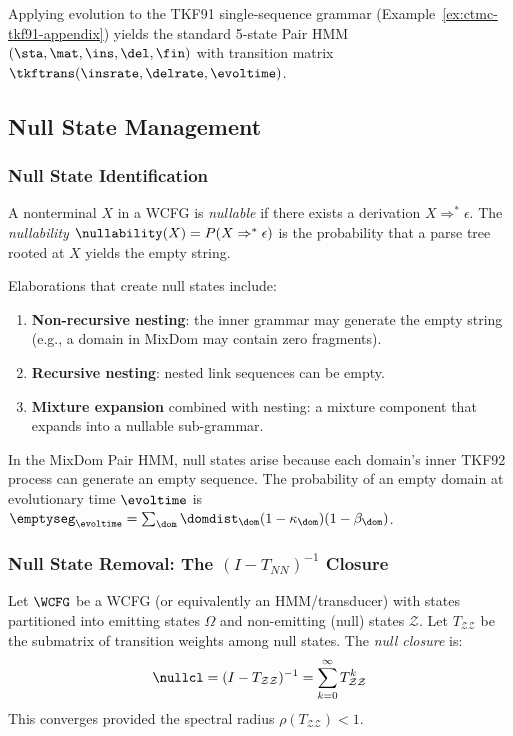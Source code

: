 \begin{example}
Applying evolution to the TKF91 single-sequence grammar
(Example~\ref{ex:ctmc-tkf91-appendix}) yields the standard 5-state
Pair HMM $(\sta, \mat, \ins, \del, \fin)$ with transition matrix
$\tkftrans(\insrate, \delrate, \evoltime)$.
\end{example}

\subsection{Null State Management}
\label{sec:null-management-appendix}

\subsubsection{Null State Identification}

\begin{definition}
A nonterminal $X$ in a WCFG is \emph{nullable} if there exists
a derivation $X \Rightarrow^* \epsilon$.
The \emph{nullability} $\nullability(X) = P(X \Rightarrow^* \epsilon)$
is the probability that a parse tree rooted at $X$ yields the
empty string.
\end{definition}

Elaborations that create null states include:
\begin{enumerate}
\item \textbf{Non-recursive nesting}: the inner grammar may generate
  the empty string (e.g., a domain in MixDom may contain zero fragments).
\item \textbf{Recursive nesting}: nested link sequences can be empty.
\item \textbf{Mixture expansion} combined with nesting:
  a mixture component that expands into a nullable sub-grammar.
\end{enumerate}

In the MixDom Pair HMM, null states arise because each domain's
inner TKF92 process can generate an empty sequence.
The probability of an empty domain at evolutionary time $\evoltime$
is $\emptyseg_\evoltime = \sum_\dom \domdist_\dom (1-\kappa_\dom)(1-\beta_\dom)$.

\subsubsection{Null State Removal: The $(I - T_{NN})^{-1}$ Closure}
\label{sec:null-removal-appendix}

\begin{definition}
Let $\WCFG$ be a WCFG (or equivalently an HMM/transducer) with
states partitioned into emitting states $\Omega$ and non-emitting
(null) states $\mathcal{Z}$.  Let $T_{\mathcal{Z}\mathcal{Z}}$
be the submatrix of transition weights among null states.
The \emph{null closure} is:
\begin{equation}
\nullcl = (I - T_{\mathcal{Z}\mathcal{Z}})^{-1}
= \sum_{k=0}^{\infty} T_{\mathcal{Z}\mathcal{Z}}^k
\end{equation}
This converges provided the spectral radius
$\rho(T_{\mathcal{Z}\mathcal{Z}}) < 1$.
\end{definition}

